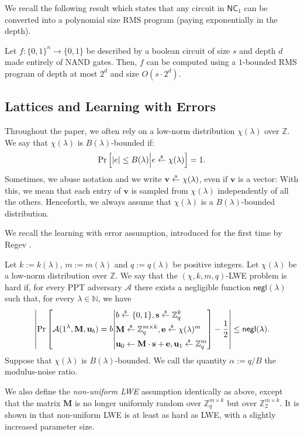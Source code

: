 \documentclass{theoretics}
\newcommand{\getsr}{\overset{\raisebox{-1pt}{$\scriptscriptstyle \$$}}{\gets}}
\newcommand{\sample}{\getsr}
\newcommand{\N}{\mathbb{N}}
\newcommand{\Z}{\mathbb{Z}}
\newcommand{\negl}{\mathsf{negl}}
\renewcommand{\sec}{\ensuremath{\lambda}}
\newcommand{\Adv}{\mathcal{A}}
\newcommand\bbbone{1}
\begin{document}
We recall the following result which states that any circuit in $\mathsf{NC}_1$ can be converted into a polynomial size RMS program (paying exponentially in the depth).

\begin{theorem}
Let $f:\{0, 1\}^n\rightarrow \{0, 1\}$ be described by a boolean circuit of size $s$ and depth $d$ made entirely of NAND gates. Then, $f$ can be computed using a $1$-bounded RMS program of depth at most $2^d$ and size $O(s\cdot 2^d)$.
\end{theorem}

\subsection{Lattices and Learning with Errors}
Throughout the paper, we often rely on a low-norm distribution $\chi(\sec)$ over $\Z$. We say that $\chi(\sec)$ is $B(\sec)$-bounded if: \[\Pr\left[\lvert e\rvert\le B(\sec)\middle| e\sample\chi(\sec)\right]=1.\] Sometimes, we abuse notation and we write $\mathbf{v}\sample\chi(\sec)$, even if $\mathbf{v}$ is a vector: With this, we mean that each entry of $\mathbf{v}$ is sampled from $\chi(\sec)$ independently of all the others. {Henceforth, we always assume that $\chi(\lambda)$ is a $B(\sec)$-bounded distribution.}

We recall the learning with error assumption, introduced for the first time by Regev \cite{STOC:Regev05}.
\begin{definition}
    Let $k:=k(\sec)$, $m:=m(\sec)$ and $q:=q(\sec)$ be positive integers. Let $\chi(\sec)$ be a low-norm distribution over $\Z$.
    We say that the $(\chi, k, m, q)$-LWE problem is hard if, for every PPT adversary $\Adv$ there exists a negligible function $\negl(\sec)$ such that, for every $\sec\in\N$, we have
    \[\left\lvert \Pr\left[\Adv(\bbbone^\sec, \mathbf{M}, \mathbf{u}_b)=b\middle| \begin{aligned}[c]
    &b\sample\{0, 1\}, \mathbf{s}\sample\Z_q^k\\
    &\mathbf{M}\sample\Z_q^{m\times k}, \mathbf{e}\sample\chi(\sec)^m\\
    &\mathbf{u}_0\gets \mathbf{M}\cdot \mathbf{s}+\mathbf{e}, \mathbf{u}_1\sample\Z_q^m\\
    \end{aligned}\right]-\frac{1}{2}
    \right\rvert\le \negl(\sec).\]
Suppose that $\chi(\sec)$ is $B(\sec)$-bounded. We call the quantity $\alpha:=q/B$ the modulus-noise ratio.
\end{definition}
%
We also define the \emph{non-uniform LWE} assumption identically as above, except that the matrix $\mathbf{M}$ is no longer uniformly random over $\Z_q^{m\times k}$ but over $\Z_2^{m\times k}$. It is shown in \cite{C:BLMR13} that non-uniform LWE is at least as hard as LWE, with a slightly increased parameter size.
\end{document}
